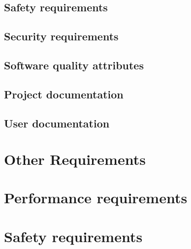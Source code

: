 \documentclass[10pt]{article}
\begin{document}
\lipsum[10]

\subsection{Safety requirements}

\lipsum[10]

\subsection{Security requirements}

\lipsum[10]

\subsection{Software quality attributes}

\lipsum[10]

\subsection{Project documentation}

\lipsum[10]

\subsection{User documentation}

\lipsum[10]

\section{Other Requirements}

\begin{appendices}

	\section{Performance requirements}

	\lipsum[10]

	\section{Safety requirements}

	\lipsum[10]

\end{appendices}
\end{document}
